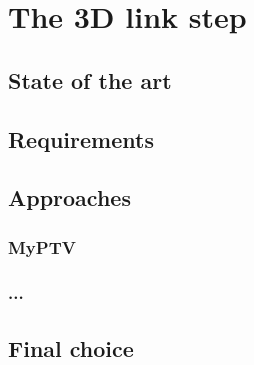 \chapter{The 3D link step}
\label{chap:3dlink}

\section{State of the art}
\section{Requirements}
\section{Approaches}
\subsection{MyPTV}
\subsection{...}
\section{Final choice}
